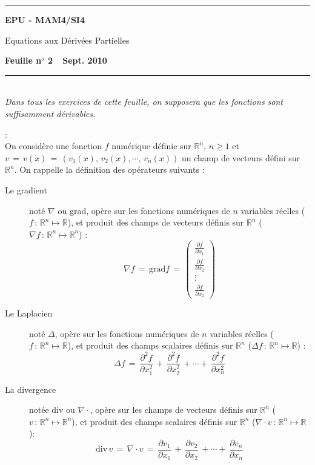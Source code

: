 \documentclass[leqno,11pt]{article}
\newcommand{\RR}{{\mathbb R}}
\newcommand{\ds}{\displaystyle}
\begin{document}
\thispagestyle{empty}
\noindent\rule{17truecm}{0.4mm}
\smallbreak
{} \hfill {\large \bf EPU - MAM4/SI4}
\smallbreak

\centerline {\large \sc Equations aux D\'eriv\'ees Partielles}

\bigbreak

 \hfill {\bf Feuille n$^o$ 2\ \ Sept. 2010}

\smallbreak


\noindent\rule{17truecm}{0.4mm} \\


\vspace{1cm}
{\sl Dans tous les exercices de cette feuille, on supposera que les fonctions sont suffisamment d\'erivables.}
\vspace{1cm}

 : \\

On consid\`ere une fonction $f$ num\'erique d\'efinie sur $\ds \RR^n, \, n\ge1$ et $\ds v \, = \, v(x) \, = \, (v_1(x), \,v_2(x), \cdots , \, v_n(x))$ un champ de vecteurs d\'efini sur $\ds \RR^n$. On rappelle la d\'efinition des op\'erateurs suivants :
\begin{description}
\item [Le gradient] not\'e $\nabla$ ou grad, op\`ere sur les fonctions num\'eriques de $n$ variables r\'eelles ($\ds f \, :  \, \RR^n \longmapsto \RR$), et produit des champs de vecteurs d\'efinis sur $\ds \RR^n$ ($\ds \nabla f \, : \, \RR^n \longmapsto \RR^n$) :
$$
\nabla f \, = \, \mbox{grad} f \, = \,
\left(
\begin{array}{c}
\ds \frac{\partial f}{\partial x_1} \\
\ds \frac{ \partial f}{\partial x_2}\\
\ds \vdots \\
\ds \frac{ \partial f}{\partial x_2}
\end{array}
\right)
$$
\item [Le Laplacien] not\'e $\Delta$, op\`ere sur les fonctions num\'eriques de $n$ variables r\'eelles ($\ds f \, : \, \RR^n \longmapsto \RR$), et produit des champs scalaires d\'efinis sur $\ds \RR^n$ ($\ds \Delta f \, : \, \RR^n \longmapsto \RR$) :
$$
\Delta f \, = \, \frac{\partial^2 f}{\partial x_1^2} \, + \, \frac{\partial^2 f}{\partial x_2^2} \, + \cdots + \,\frac{\partial^2 f}{\partial x_n^2}
$$

\item [La divergence] not\'ee div ou $\nabla \cdot$, op\`ere sur les champs de vecteurs d\'efinis sur $\ds \RR^n$ ($\ds v \, : \, \RR^n \longmapsto \RR^n$), et produit des champs scalaires d\'efinis sur $\ds \RR^n$ ($\ds \nabla \cdot  v \, : \, \RR^n \longmapsto \RR$):
$$
\mbox{div} \, v \, = \, \nabla \cdot v \, = \, \frac{\partial v_1}{\partial x_1} \, + \,  \frac{\partial v_2}{\partial x_2} \, + \cdots + \, \frac{\partial v_n}{\partial x_n}
$$
\end{description}
\end{document}
